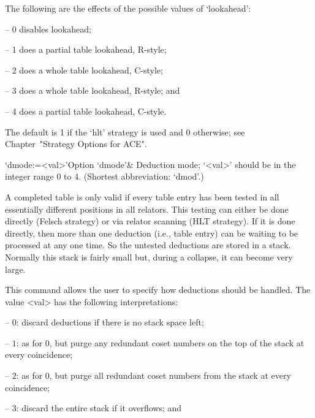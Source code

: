 The following are the effects of the possible values of `lookahead':

\beginlist

\item{--} 0 disables lookahead;
\item{--} 1 does a partial table lookahead, R-style; 
\item{--} 2 does a whole table lookahead, C-style; 
\item{--} 3 does a whole table lookahead, R-style; and
\item{--} 4 does a partial table lookahead, C-style.  

\endlist

The default is 1 if the `hlt' strategy is used and  0  otherwise;  see
Chapter~"Strategy Options for ACE".

\enditems


\beginitems

\>`dmode:=<val>'{Option `dmode'}&
Deduction mode; `<val>' should be in the integer range 0 to 4.
(Shortest abbreviation: `dmod'.)

A completed table  is only valid if every table  entry has been tested
in all essentially different  positions in all relators.  This testing
can either be done directly  (Felsch strategy) or via relator scanning
(HLT strategy).  If it is  done directly, then more than one deduction
(i.e., table  entry) can be waiting  to be processed at  any one time.
So the untested deductions are stored in a stack.  Normally this stack
is fairly small but, during a collapse, it can become very large.

This command allows the user  to  specify  how  deductions  should  be
handled. The value <val> has the following interpretations:

\beginlist

\item{--} $0$:  
discard deductions if there is no stack space left;

\item{--} $1$: 
as for $0$, but purge any redundant coset numbers on the  top  of  the
stack at every coincidence;

\item{--} $2$: 
as for 0, but purge all redundant coset  numbers  from  the  stack  at
every coincidence;

\item{--} $3$:
discard the entire stack if it overflows; and

